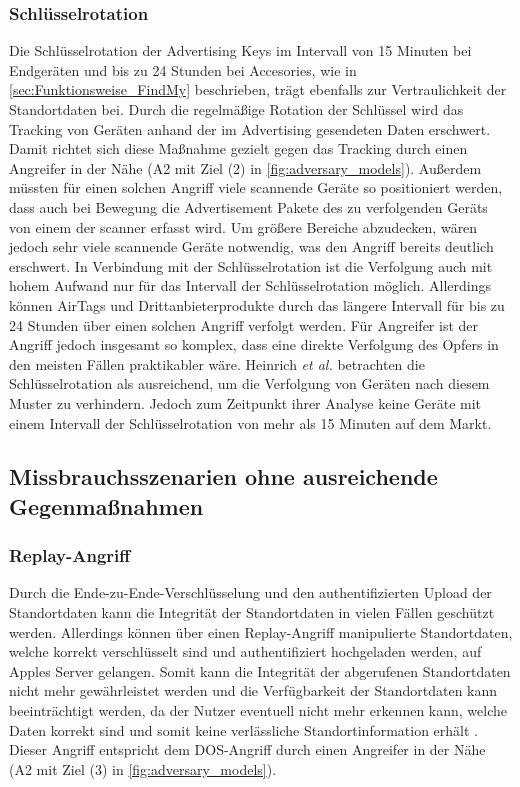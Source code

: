\subsubsection{Schlüsselrotation}
Die Schlüsselrotation der Advertising Keys im Intervall von 15 Minuten bei Endgeräten und bis zu 24 Stunden bei Accesories, wie in \autoref{sec:Funktionsweise_FindMy} beschrieben, trägt ebenfalls zur Vertraulichkeit der Standortdaten bei.
Durch die regelmäßige Rotation der Schlüssel wird das Tracking von Geräten anhand der im Advertising gesendeten Daten erschwert.
Damit richtet sich diese Maßnahme gezielt gegen das Tracking durch einen Angreifer in der Nähe (A2 mit Ziel (2) in \autoref{fig:adversary_models}).
Außerdem müssten für einen solchen Angriff viele scannende Geräte so positioniert werden, dass auch bei Bewegung die Advertisement Pakete des zu verfolgenden Geräts von einem der scanner erfasst wird.
Um größere Bereiche abzudecken, wären jedoch sehr viele scannende Geräte notwendig, was den Angriff bereits deutlich erschwert.
In Verbindung mit der Schlüsselrotation ist die Verfolgung auch mit hohem Aufwand nur für das Intervall der Schlüsselrotation möglich.
Allerdings können AirTags und Drittanbieterprodukte durch das längere Intervall für bis zu 24 Stunden über einen solchen Angriff verfolgt werden.
Für Angreifer ist der Angriff jedoch insgesamt so komplex, dass eine direkte Verfolgung des Opfers in den meisten Fällen praktikabler wäre.
Heinrich \textit{et al.} \cite{Heinrich_FindMy} betrachten die Schlüsselrotation als ausreichend, um die Verfolgung von Geräten nach diesem Muster zu verhindern.
Jedoch zum Zeitpunkt ihrer Analyse keine Geräte mit einem Intervall der Schlüsselrotation von mehr als 15 Minuten auf dem Markt.

\subsection{Missbrauchsszenarien ohne ausreichende Gegenmaßnahmen}
\label{sec:szenarien}

\subsubsection{Replay-Angriff}
Durch die Ende-zu-Ende-Verschlüsselung und den authentifizierten Upload der Standortdaten kann die Integrität der Standortdaten in vielen Fällen geschützt werden.
Allerdings können über einen Replay-Angriff manipulierte Standortdaten, welche korrekt verschlüsselt sind und authentifiziert hochgeladen werden, auf Apples Server gelangen.
Somit kann die Integrität der abgerufenen Standortdaten nicht mehr gewährleistet werden und die Verfügbarkeit der Standortdaten kann beeinträchtigt werden, da der Nutzer eventuell nicht mehr erkennen kann, welche Daten korrekt sind und somit keine verlässliche Standortinformation erhält \cite{Heinrich_FindMy}.
Dieser Angriff entspricht dem \ac{DOS}-Angriff durch einen Angreifer in der Nähe (A2 mit Ziel (3) in \autoref{fig:adversary_models}).

